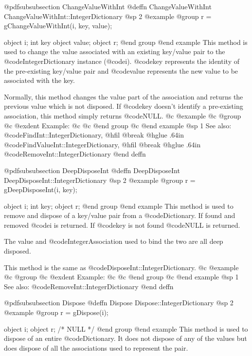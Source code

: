 @pdfsubsubsection {ChangeValueWithInt}
@deffn {ChangeValueWithInt} ChangeValueWithInt::IntegerDictionary
@sp 2
@example
@group
r = gChangeValueWithInt(i, key, value);

object  i;
int     key
object  value;
object  r;
@end group
@end example
This method is used to change the value associated with an existing
key/value pair to the @code{IntegerDictionary} instance (@code{i}).
@code{key} represents the identity of the pre-existing key/value
pair and @code{value} represents the new value to be associated with
the key.

Normally, this method changes the value part of the association
and returns the previous value which is not disposed.  If
@code{key} doesn't identify a pre-existing association, this method
simply returns @code{NULL}.
@c @example
@c @group
@c @exdent Example:
@c 
@c @end group
@c @end example
@sp 1
See also:  @code{FindInt::IntegerDictionary,}
@hfil @break @hglue .64in      @code{FindValueInt::IntegerDictionary,}
@hfil @break @hglue .64in      @code{RemoveInt::IntegerDictionary}
@end deffn











@pdfsubsubsection {DeepDisposeInt}
@deffn {DeepDisposeInt} DeepDisposeInt::IntegerDictionary
@sp 2
@example
@group
r = gDeepDisposeInt(i, key);

object  i;
int     key;
object  r;
@end group
@end example
This method is used to remove and dispose of a key/value pair from a
@code{Dictionary}.  If found and removed @code{i} is returned.  If @code{key}
is not found @code{NULL} is returned.

The value and @code{IntegerAssociation} used to bind the two are all deep
disposed.

This method is the same as @code{DisposeInt::IntegerDictionary}.
@c @example
@c @group
@c @exdent Example:
@c 
@c @end group
@c @end example
@sp 1
See also:  @code{RemoveInt::IntegerDictionary}
@end deffn













@pdfsubsubsection {Dispose}
@deffn {Dispose} Dispose::IntegerDictionary
@sp 2
@example
@group
r = gDispose(i);

object  i;
object  r;     /*  NULL  */
@end group
@end example
This method is used to dispose of an entire @code{Dictionary}.  It does not
dispose of any of the values but does dispose of all the associations
used to represent the pair.  

